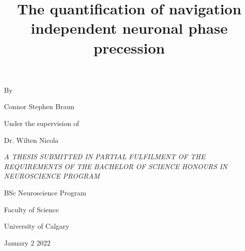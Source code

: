 \documentclass[12pt, letterpaper]{article}
\title{The quantification of navigation independent neuronal phase precession}
\date{}
\newenvironment{collapsable}{}{}
\begin{document}
\begin{collapsable}
    \maketitle
    \fontsize{12}{12}\selectfont
    \begin{large}
        \centerline{By}\vspace{12pt}
        \centerline{Connor Stephen Braun}\vspace{24pt}
        \centerline{Under the supervision of}\vspace{12pt}
        \centerline{Dr. Wilten Nicola}\vspace{72pt}
        {\centering\it
        A THESIS SUBMITTED IN PARTIAL FULFILMENT OF THE REQUIREMENTS OF THE BACHELOR
        OF SCIENCE HONOURS IN NEUROSCIENCE PROGRAM\\}

        \vspace{36pt}
        \centerline{BSc Neuroscience Program}
        \centerline{Faculty of Science}
        \centerline{University of Calgary}\vspace{36pt}
        \centerline{January 2 2022}
    \end{large}
\end{collapsable}
\newpage
\end{document}
